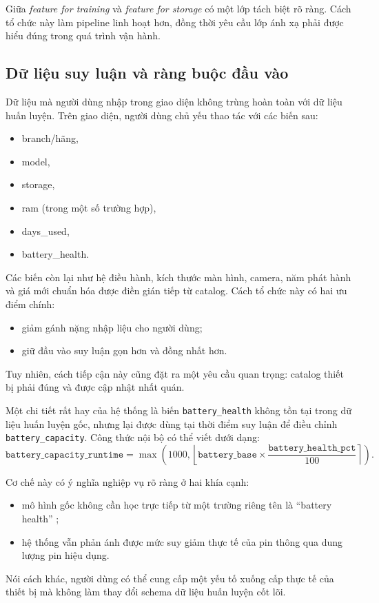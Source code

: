Giữa \textit{feature for training} và \textit{feature for storage} có một lớp tách biệt rõ ràng. Cách tổ chức này làm pipeline linh hoạt hơn, đồng thời yêu cầu lớp ánh xạ phải được hiểu đúng trong quá trình vận hành.

\subsection{Dữ liệu suy luận và ràng buộc đầu vào}

Dữ liệu mà người dùng nhập trong giao diện không trùng hoàn toàn với dữ liệu huấn luyện. Trên giao diện, người dùng chủ yếu thao tác với các biến sau:

\begin{itemize}
    \item branch/hãng,
    \item model,
    \item storage,
    \item ram (trong một số trường hợp),
    \item days\_used,
    \item battery\_health.
\end{itemize}

Các biến còn lại như hệ điều hành, kích thước màn hình, camera, năm phát hành và giá mới chuẩn hóa được điền gián tiếp từ catalog. Cách tổ chức này có hai ưu điểm chính:
\begin{itemize}
    \item giảm gánh nặng nhập liệu cho người dùng;
    \item giữ đầu vào suy luận gọn hơn và đồng nhất hơn.
\end{itemize}
Tuy nhiên, cách tiếp cận này cũng đặt ra một yêu cầu quan trọng: catalog thiết bị phải đúng và được cập nhật nhất quán.


Một chi tiết rất hay của hệ thống là biến \texttt{battery\_health} không tồn tại trong dữ liệu huấn luyện gốc, nhưng lại được dùng tại thời điểm suy luận để điều chỉnh \texttt{battery\_capacity}. Công thức nội bộ có thể viết dưới dạng:
$$
\texttt{battery\_capacity\_runtime} = \max\left(1000, \left\lfloor \texttt{battery\_base}\times\frac{\texttt{battery\_health\_pct}}{100} \right\rceil\right).
$$

Cơ chế này có ý nghĩa nghiệp vụ rõ ràng ở hai khía cạnh:
\begin{itemize}
    \item mô hình gốc không cần học trực tiếp từ một trường riêng tên là ``battery health'' ;
    \item hệ thống vẫn phản ánh được mức suy giảm thực tế của pin thông qua dung lượng pin hiệu dụng.
\end{itemize}
Nói cách khác, người dùng có thể cung cấp một yếu tố xuống cấp thực tế của thiết bị mà không làm thay đổi schema dữ liệu huấn luyện cốt lõi.


